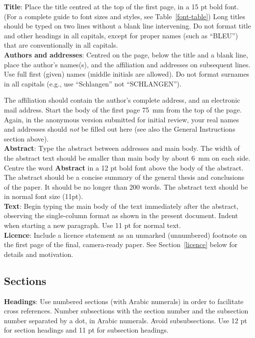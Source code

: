 \documentclass[a4paper,11pt]{article}
\begin{document}
{\bf Title}: Place the title centred at the top of the first page, in
a 15 pt bold font. (For a complete guide to font sizes and styles,
see Table~\ref{font-table}) Long titles should be typed on two lines
without a blank line intervening.
Do not format title and other headings in all
capitals, except for proper names (such as ``BLEU'') that are
conventionally in all capitals.  \\

{\bf Authors and addresses}: Centred on the page,
below the title and a blank line, place the author's names(s), 
and the affiliation and addresses on subsequent lines.
Use full first (given) names (middle initials are allowed). Do
not format surnames in all capitals (e.g., use ``Schlangen'' not
``SCHLANGEN'').  

The affiliation should contain the
author's complete address, and an electronic mail
address. Start the body of the first page 75~mm from the top of the
page.
Again, in the anonymous version submitted for initial review, your real names and addresses
should \emph{not} be filled out here (see also the General Instructions section above).\\

{\bf Abstract}: Type the abstract between addresses and main body.
The width of the abstract text should be
smaller than main body by about 6~mm on each side.
Centre the word {\bf Abstract} in a 12 pt bold
font above the body of the abstract. The abstract should be a concise
summary of the general thesis and conclusions of the paper. It should
be no longer than 200 words. The abstract text should be in normal font size (11pt).\\

{\bf Text}: Begin typing the main body of the text immediately after
the abstract, observing the single-column format as shown in
the present document. Indent when starting a new paragraph. Use 11 pt for normal text.\\

{\bf Licence}: Include a licence statement as an unmarked (unnumbered)
footnote on the first page of the final, camera-ready paper.
See Section~\ref{licence} below for details and motivation.


\subsection{Sections}

{\bf Headings}: Use numbered sections (with Arabic
numerals) in order to facilitate cross references. Number subsections
with the section number and the subsection number separated by a dot,
in Arabic numerals. Avoid subsubsections.  Use 12 pt for section headings and 11 pt for subsection headings.\\
\end{document}
